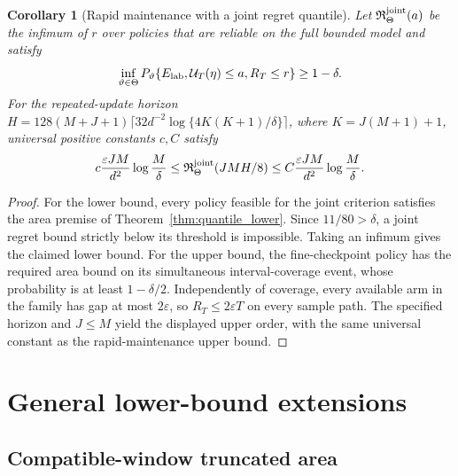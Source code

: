 \documentclass[11pt]{article}
\newtheorem{corollary}[theorem]{Corollary}
\theoremstyle{remark}
\begin{document}
\begin{corollary}[Rapid maintenance with a joint regret quantile]
\label{cor:joint_quantile}
Let $\mathfrak R^{\rm joint}_\Theta(a)$ be the infimum of $r$ over policies
that are reliable on the full bounded model and satisfy
\[
 \inf_{\vartheta\in\Theta}
 P_\vartheta\{E_{\rm lab},\mathcal U_T(\eta)\le a,R_T\le r\}\ge1-\delta.
\]
For the repeated-update horizon
$H=128(M+J+1)\lceil32d^{-2}\log\{4K(K+1)/\delta\}\rceil$,
where $K=J(M+1)+1$, universal positive constants $c,C$ satisfy
\[
 c\frac{\varepsilon JM}{d^2}\log\frac M\delta
 \le\mathfrak R^{\rm joint}_\Theta(JMH/8)
 \le C\frac{\varepsilon JM}{d^2}\log\frac M\delta.
\]
\end{corollary}
\begin{proof}
For the lower bound, every policy feasible for the joint criterion satisfies
the area premise of Theorem~\ref{thm:quantile_lower}. Since
$11/80>\delta$, a joint regret bound strictly below its threshold is
impossible. Taking an infimum gives the claimed lower bound.
For the upper bound, the fine-checkpoint policy has the required area bound
on its simultaneous interval-coverage event, whose probability is at least
$1-\delta/2$. Independently of coverage, every available arm in the family has
gap at most $2\varepsilon$, so $R_T\le2\varepsilon T$ on every sample path.
The specified horizon and $J\le M$ yield the displayed upper order, with the
same universal constant as the rapid-maintenance upper bound.
\end{proof}

\section{General lower-bound extensions}
\label{sec:truncated_extension}
\subsection{Compatible-window truncated area}
\end{document}

